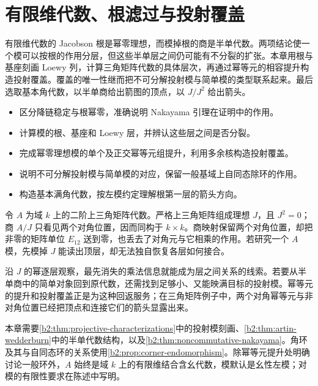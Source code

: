 
\chapter{有限维代数、根滤过与投射覆盖}
\label{b2:ch:15}

\begin{chapterabstract}
	有限维代数的 Jacobson 根是幂零理想，而模掉根的商是半单代数。两项结论使一个模可以按根的作用分层，但这些半单层之间仍可能有不分裂的扩张。本章用根与基座刻画 Loewy 列，计算三角矩阵代数的具体层次，再通过幂等元的相容提升构造投射覆盖。覆盖的唯一性继而把不可分解投射模与简单模的类型联系起来。最后选取基本角代数，以半单商给出箭图的顶点，以 \(J/J^2\) 给出箭头。
\end{chapterabstract}

\begin{learninggoals}
	\begin{itemize}
		\item 区分降链稳定与根幂零，准确说明 Nakayama 引理在证明中的作用。
		\item 计算模的根、基座和 Loewy 层，并辨认这些层之间是否分裂。
		\item 完成幂零理想模的单个及正交幂等元组提升，利用多余核构造投射覆盖。
		\item 说明不可分解投射模与简单模的对应，保留一般基域上自同态除环的作用。
		\item 构造基本满角代数，按左模约定理解根第一层的箭头方向。
	\end{itemize}
\end{learninggoals}

令 \(A\) 为域 \(k\) 上的二阶上三角矩阵代数。严格上三角矩阵组成理想 \(J\)，且 \(J^2=0\)；商 \(A/J\) 只看见两个对角位置，因而同构于 \(k\times k\)。商映射保留两个对角位置，却把非零的矩阵单位 \(E_{12}\) 送到零，也丢去了对角元与它相乘的作用。若研究一个 \(A\) 模，先模掉 \(J\) 能读出顶层，却无法独自恢复各层如何接合。

\ProseParagraphBreak

沿 \(J\) 的幂逐层观察，最先消失的乘法信息就能成为层之间关系的线索。若要从半单商中的简单对象回到原代数，还需找到足够小、又能映满目标的投射模。幂等元的提升和投射覆盖正是为这种回返服务；在三角矩阵例子中，两个对角幂等元与非对角位置已经把顶点和连接它们的箭头显露出来。

\ProseParagraphBreak

本章需要\cref{b2:thm:projective-characterizations}中的投射模刻画、\cref{b2:thm:artin-wedderburn}中的半单代数结构，以及\cref{b2:thm:noncommutative-nakayama}。角环及其与自同态环的关系使用\cref{b2:prop:corner-endomorphism}。除幂等元提升处明确讨论一般环外，\(A\) 始终是域 \(k\) 上的有限维结合含幺代数，模默认是幺性左模；对模的有限性要求在陈述中写明。

